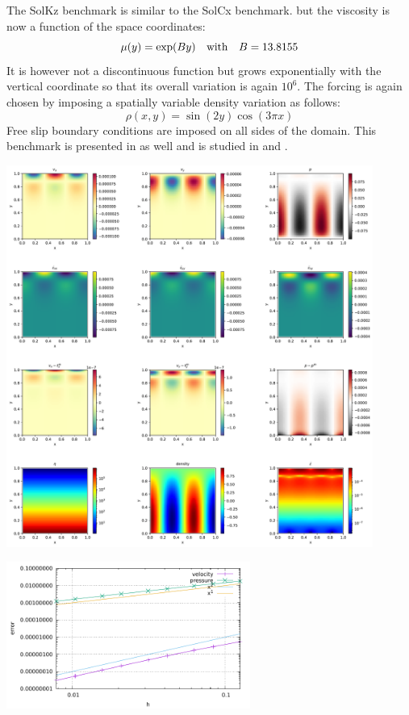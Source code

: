 
The SolKz benchmark \cite{repa87} is similar to the SolCx benchmark.
but the viscosity is now a function of the space coordinates: 
\begin{equation}
\mu(y)=\exp(By) \quad {\rm with} \quad B=13.8155
\end{equation}
It is however not a discontinuous function but grows exponentially with the vertical coordinate so that its overall variation is again $10^6$. 
The forcing is again chosen by imposing a spatially variable density variation as follows:
\begin{equation}
\rho(x,y)=\sin(2y) \cos(3\pi x)
\end{equation}
Free slip boundary conditions are imposed on all sides of the domain.
This benchmark is presented in \cite{zhon96} as well and is studied in \cite{dumg11} and \cite{gemd13}.

\includegraphics[width=12cm]{python_codes/fieldstone_06/solution.pdf}

\includegraphics[width=8cm]{python_codes/fieldstone_06/errors.pdf}
